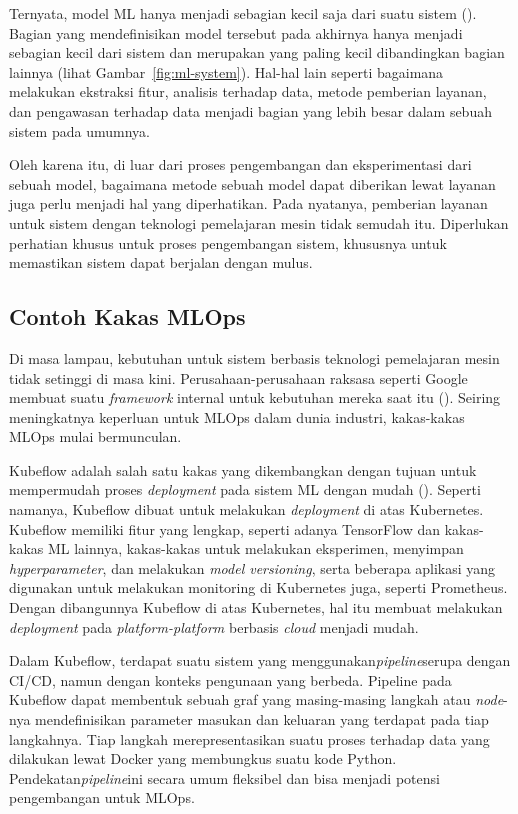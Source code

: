 Ternyata, model ML hanya menjadi sebagian kecil saja dari suatu sistem (\cite{NIPS2015_86df7dcf}).
Bagian yang mendefinisikan model tersebut pada akhirnya hanya menjadi sebagian kecil dari sistem dan merupakan yang paling kecil dibandingkan bagian lainnya (lihat Gambar~\ref{fig:ml-system}).
Hal-hal lain seperti bagaimana melakukan ekstraksi fitur, analisis terhadap data, metode pemberian layanan, dan pengawasan terhadap data menjadi bagian yang lebih besar dalam sebuah sistem pada umumnya.

Oleh karena itu, di luar dari proses pengembangan dan eksperimentasi dari sebuah model, bagaimana metode sebuah model dapat diberikan lewat layanan juga perlu menjadi hal yang diperhatikan.
Pada nyatanya, pemberian layanan untuk sistem dengan teknologi pemelajaran mesin tidak semudah itu.
Diperlukan perhatian khusus untuk proses pengembangan sistem, khususnya untuk memastikan sistem dapat berjalan dengan mulus.

\subsection{Contoh Kakas MLOps}

Di masa lampau, kebutuhan untuk sistem berbasis teknologi pemelajaran mesin tidak setinggi di masa kini. 
Perusahaan-perusahaan raksasa seperti Google membuat suatu \textit{framework} internal untuk kebutuhan mereka saat itu (\cite{mlops}).
Seiring meningkatnya keperluan untuk MLOps dalam dunia industri, kakas-kakas MLOps mulai bermunculan.

Kubeflow adalah salah satu kakas yang dikembangkan dengan tujuan untuk mempermudah proses \textit{deployment} pada sistem ML dengan mudah (\cite{k8s}).
Seperti namanya, Kubeflow dibuat untuk melakukan \textit{deployment} di atas Kubernetes.
Kubeflow memiliki fitur yang lengkap, seperti adanya TensorFlow dan kakas-kakas ML lainnya, kakas-kakas untuk melakukan eksperimen, menyimpan \textit{hyperparameter}, dan melakukan \textit{model versioning}, serta beberapa aplikasi yang digunakan untuk melakukan monitoring di Kubernetes juga, seperti Prometheus.
Dengan dibangunnya Kubeflow di atas Kubernetes, hal itu membuat melakukan \textit{deployment} pada \textit{platform-platform} berbasis \textit{cloud} menjadi mudah.

Dalam Kubeflow, terdapat suatu sistem yang menggunakan\textit{pipeline}serupa dengan CI/CD, namun dengan konteks pengunaan yang berbeda.
Pipeline pada Kubeflow dapat membentuk sebuah graf yang masing-masing langkah atau \textit{node}-nya mendefinisikan parameter masukan dan keluaran yang terdapat pada tiap langkahnya.
Tiap langkah merepresentasikan suatu proses terhadap data yang dilakukan lewat Docker yang membungkus suatu kode Python.
Pendekatan\textit{pipeline}ini secara umum fleksibel dan bisa menjadi potensi pengembangan untuk MLOps.

